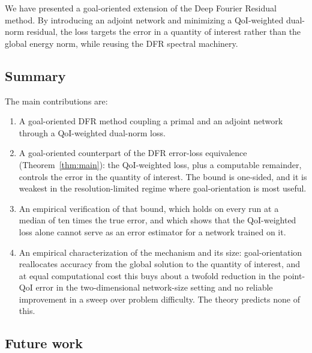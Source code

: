 \documentclass[preprint,11pt]{elsarticle}
\begin{document}
We have presented a goal-oriented extension of the Deep Fourier Residual method. By introducing an adjoint network and minimizing a QoI-weighted dual-norm residual, the loss targets the error in a quantity of interest rather than the global energy norm, while reusing the DFR spectral machinery.

\subsection{Summary}

The main contributions are:
\begin{enumerate}
    \item A goal-oriented DFR method coupling a primal and an adjoint network through a QoI-weighted dual-norm loss.
    \item A goal-oriented counterpart of the DFR error-loss equivalence (Theorem~\ref{thm:main}): the QoI-weighted loss, plus a computable remainder, controls the error in the quantity of interest. The bound is one-sided, and it is weakest in the resolution-limited regime where goal-orientation is most useful.
    \item An empirical verification of that bound, which holds on every run at a median of ten times the true error, and which shows that the QoI-weighted loss alone cannot serve as an error estimator for a network trained on it.
    \item An empirical characterization of the mechanism and its size: goal-orientation reallocates accuracy from the global solution to the quantity of interest, and at equal computational cost this buys about a twofold reduction in the point-QoI error in the two-dimensional network-size setting and no reliable improvement in a sweep over problem difficulty. The theory predicts none of this.
\end{enumerate}

\subsection{Future work}
\end{document}
